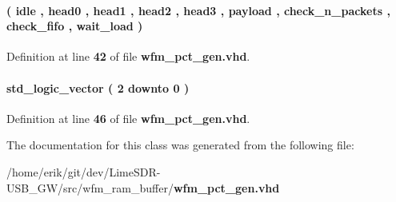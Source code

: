 \paragraph[{state\+\_\+type}]{ {\bfseries \textcolor{vhdlchar}{(}\textcolor{vhdlchar}{ }\textcolor{vhdlchar}{idle}\textcolor{vhdlchar}{ }\textcolor{vhdlchar}{,}\textcolor{vhdlchar}{ }\textcolor{vhdlchar}{head0}\textcolor{vhdlchar}{ }\textcolor{vhdlchar}{,}\textcolor{vhdlchar}{ }\textcolor{vhdlchar}{head1}\textcolor{vhdlchar}{ }\textcolor{vhdlchar}{,}\textcolor{vhdlchar}{ }\textcolor{vhdlchar}{head2}\textcolor{vhdlchar}{ }\textcolor{vhdlchar}{,}\textcolor{vhdlchar}{ }\textcolor{vhdlchar}{head3}\textcolor{vhdlchar}{ }\textcolor{vhdlchar}{,}\textcolor{vhdlchar}{ }\textcolor{vhdlchar}{payload}\textcolor{vhdlchar}{ }\textcolor{vhdlchar}{,}\textcolor{vhdlchar}{ }\textcolor{vhdlchar}{check\+\_\+n\+\_\+packets}\textcolor{vhdlchar}{ }\textcolor{vhdlchar}{,}\textcolor{vhdlchar}{ }\textcolor{vhdlchar}{check\+\_\+fifo}\textcolor{vhdlchar}{ }\textcolor{vhdlchar}{,}\textcolor{vhdlchar}{ }\textcolor{vhdlchar}{wait\+\_\+load}\textcolor{vhdlchar}{ }\textcolor{vhdlchar}{)}\textcolor{vhdlchar}{ }} \hspace{0.3cm}{\ttfamily [Type]}}\label{classwfm__pct__gen_1_1arch_a04a6eab944d36da76bef08538af12b70}


Definition at line {\bf 42} of file {\bf wfm\+\_\+pct\+\_\+gen.\+vhd}.

\paragraph[{wfm\+\_\+load\+\_\+reg}]{ {\bfseries \textcolor{comment}{std\+\_\+logic\+\_\+vector}\textcolor{vhdlchar}{ }\textcolor{vhdlchar}{(}\textcolor{vhdlchar}{ }\textcolor{vhdlchar}{ } \textcolor{vhdldigit}{2} \textcolor{vhdlchar}{ }\textcolor{keywordflow}{downto}\textcolor{vhdlchar}{ }\textcolor{vhdlchar}{ } \textcolor{vhdldigit}{0} \textcolor{vhdlchar}{ }\textcolor{vhdlchar}{)}\textcolor{vhdlchar}{ }} \hspace{0.3cm}{\ttfamily [Signal]}}\label{classwfm__pct__gen_1_1arch_a7dda474bf4fc4204be7dd77925f280ea}


Definition at line {\bf 46} of file {\bf wfm\+\_\+pct\+\_\+gen.\+vhd}.



The documentation for this class was generated from the following file\+:\begin{DoxyCompactItemize}
\item 
/home/erik/git/dev/\+Lime\+S\+D\+R-\/\+U\+S\+B\+\_\+\+G\+W/src/wfm\+\_\+ram\+\_\+buffer/{\bf wfm\+\_\+pct\+\_\+gen.\+vhd}\end{DoxyCompactItemize}
